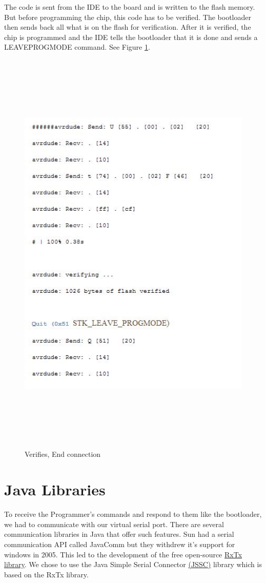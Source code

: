 The code is sent from the IDE to the board and is written to the flash memory. But before programming the chip, this code has to be verified. The bootloader then sends back all what is on the flash for verification. After it is verified, the chip is programmed and the IDE tells the bootloader that it is done and sends a LEAVEPROGMODE command. See Figure  \ref{LEAVE_PROGMODE}.
\begin{figure}[h!]
\centering
\includegraphics[height=20cm, width=16cm]{EndVarifyLeaveProgMode.JPG}
\caption{Verifies, End connection}
\label{LEAVE_PROGMODE}
\end{figure}

\section{Java Libraries}
To receive the Programmer's commands and respond to them like the bootloader, we had to communicate with our virtual serial port. There are several communication libraries in Java that offer such features. Sun had a serial communication API called JavaComm but they withdrew it's support for windows in 2005. This led to the development of the free open-source \href{http://rxtx.qbang.org/wiki/index.php/Main_Page}{RxTx library}. We chose to use the Java Simple Serial Connector \href{https://code.google.com/p/java-simple-serial-connector/}{(JSSC)} library which is based on the RxTx library.

\clearpage  %
